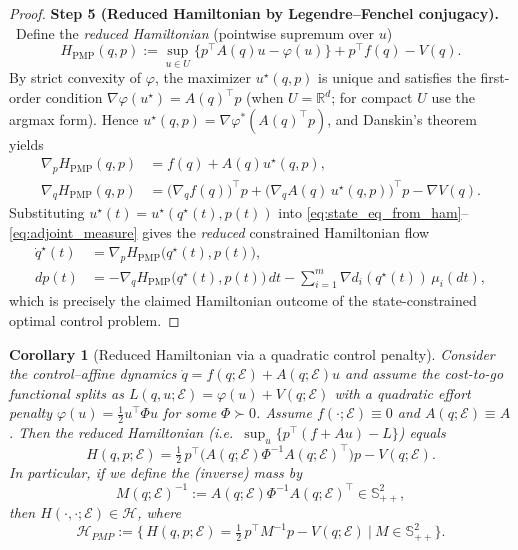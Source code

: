 \documentclass{article} %
\newtheorem{corollary}[theorem]{Corollary}
\begin{document}
\begin{proof}
\smallskip
\noindent\textbf{Step 5 (Reduced Hamiltonian by Legendre--Fenchel conjugacy).}
~Define the \emph{reduced Hamiltonian} (pointwise supremum over $u$)
\begin{equation}
H_{\mathrm{PMP}}(q,p)
:=\sup_{u\in U}\Big\{p^\top A(q)u-\varphi(u)\Big\}+p^\top f(q)-V(q).
\end{equation}
By strict convexity of $\varphi$, the maximizer $u^\star(q,p)$ is unique and satisfies the first-order condition
$\nabla\varphi(u^\star)=A(q)^\top p$ (when $U=\mathbb{R}^d$; for compact $U$ use the argmax form).
Hence $u^\star(q,p)=\nabla\varphi^\ast(A(q)^\top p)$, and Danskin's theorem yields
\[
\begin{aligned}
\nabla_p H_{\mathrm{PMP}}(q,p)&=f(q)+A(q)u^\star(q,p), \\
\nabla_q H_{\mathrm{PMP}}(q,p)&=\big(\nabla_q f(q)\big)^\top p+\big(\nabla_q A(q)\,u^\star(q,p)\big)^\top p-\nabla V(q).    
\end{aligned}
\]
Substituting $u^\star(t)=u^\star(q^\star(t),p(t))$ into
\cref{eq:state_eq_from_ham}--\cref{eq:adjoint_measure} gives the \emph{reduced} constrained Hamiltonian flow
\begin{equation}
\begin{aligned}
\dot q^\star(t)&=\nabla_p H_{\mathrm{PMP}}\big(q^\star(t),p(t)\big), \\ 
dp(t)&= -\nabla_q H_{\mathrm{PMP}}\big(q^\star(t),p(t)\big)\,dt -\sum_{i=1}^m \nabla d_i(q^\star(t))\,\mu_i(dt),    
\end{aligned}
\end{equation}
which is precisely the claimed Hamiltonian outcome of the state-constrained optimal control problem.
\end{proof}

\begin{corollary}[Reduced Hamiltonian via a quadratic control penalty]
\label{cor:mechanical_reduced_hamiltonian}
Consider the control--affine dynamics $\dot q=f(q;\mathcal E)+A(q;\mathcal E)u$ and assume the { cost-to-go functional} splits as
$L(q,u;\mathcal E)=\varphi(u) + {V}(q;\mathcal E)$ with a quadratic effort penalty
\(
\varphi(u)=\tfrac12 u^\top \Phi u
\)
 for some $\Phi\succ 0$. Assume $f(\cdot;\mathcal E)\equiv 0$ and $A(q;\mathcal{E})\equiv A$.
Then the reduced Hamiltonian (i.e.\ $\sup_u\{p^\top(f+A u)-L\}$) equals
\[
H(q,p;\mathcal E)
=\tfrac12\,p^\top\!\big(A(q;\mathcal E)\Phi^{-1}A(q;\mathcal E)^\top\big)p -V(q;\mathcal E).
\]
In particular, if we define the (inverse) mass by
\[
M(q;\mathcal E)^{-1}:=A(q;\mathcal E)\Phi^{-1}A(q;\mathcal E)^\top\in\mathbb S_{++}^2,
\]
then \(H(\cdot,\cdot;\mathcal E)\in\mathscr H\), where
\[
\mathscr{H}_{PMP}:=\Big\{\,H(q,p;\mathcal{E})=\tfrac12\,p^\top M^{-1}p{-}V(q;\mathcal{E})
\ \Big|\ M\in \mathbb{S}_{++}^2 \Big\}.
\]
\end{corollary}
\end{document}
